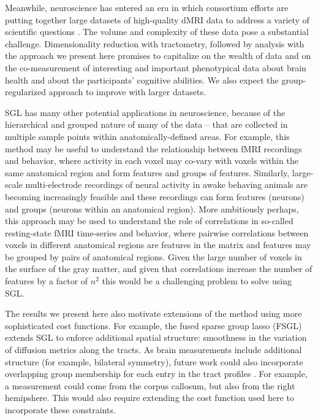 Meanwhile, neuroscience has entered an era in which consortium efforts are
putting together large datasets of high-quality dMRI data to address a variety
of scientific questions \cite{jernigan2016ping, jernigan2018abcd,
alexander2017open, Miller2016-hw, VanEssen2012}. The volume and complexity of
these data pose a substantial challenge. Dimensionality reduction with
tractometry, followed by analysis with the approach we present here promises to
capitalize on the wealth of data and on the co-measurement of interesting and
important phenotypical data about brain health and about the participants'
cognitive abilities. We also expect the group-regularized approach to improve
with larger datasets.

SGL has many other potential applications in neuroscience, because of the
hierarchical and grouped nature of many of the data -- that are collected in
multiple sample points within anatomically-defined areas. For example, this
method may be useful to understand the relationship between fMRI recordings and
behavior, where activity in each voxel may co-vary with voxels within the same
anatomical region and form features and groups of features. Similarly,
large-scale multi-electrode recordings of neural activity in awake behaving
animals are becoming increasingly feasible \cite{steinmetz2018distributed,
Jun2017-gv} and these recordings can form features (neurons) and groups (neurons
within an anatomical region). More ambitiously perhaps, this approach may be
used to understand the role of correlations in so-called resting-state fMRI
time-series and behavior, where pairwise correlations between voxels in
different anatomical regions are features in the matrix and features may be
grouped by pairs of anatomical regions. Given the large number of voxels in the
surface of the gray matter, and given that correlations increase the number of
features by a factor of $n^2$ this would be a challenging problem to solve using
SGL.

The results we present here also motivate extensions of the method using more
sophisticated cost functions. For example, the fused sparse group lasso (FSGL)
\cite{zhou2012} extends SGL to enforce additional spatial structure: smoothness
in the variation of diffusion metrics along the tracts. As brain measurements
include additional structure (for example, bilateral symmetry), future work
could also incorporate overlapping group membership for each entry in the tract
profiles . For example, a measurement could come from the
corpus callosum, but also from the right hemipshere. This would also require
extending the cost function used here to incorporate these constraints.

